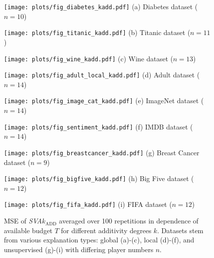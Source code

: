 \begin{figure*}[ht]
\centering
\begin{minipage}[c]{0.32\textwidth}
   \centering
   \texttt{[image: plots/fig\_diabetes\_kadd.pdf]}
   (a) Diabetes dataset ($n=10$)
   \label{fig:diabetes_kadd}
\end{minipage}
\begin{minipage}[c]{0.32\textwidth}
    \centering
    \texttt{[image: plots/fig\_titanic\_kadd.pdf]}
    (b) Titanic dataset ($n=11$)
    \label{fig:titanic_kadd}
\end{minipage}
\begin{minipage}[c]{0.32\textwidth}
    \centering
    \texttt{[image: plots/fig\_wine\_kadd.pdf]}
    (c) Wine dataset ($n=13$)
    \label{fig:wine_kadd}
\end{minipage}
%
\begin{minipage}[c]{0.32\textwidth}
    \centering
    \texttt{[image: plots/fig\_adult\_local\_kadd.pdf]}
    (d) Adult dataset ($n=14$)
    \label{fig:adult_local_kadd}
\end{minipage}
\begin{minipage}[c]{0.32\textwidth}
   \centering
   \texttt{[image: plots/fig\_image\_cat\_kadd.pdf]}
   (e) ImageNet dataset ($n=14$)
   \label{fig:image_cat_kadd}
\end{minipage}
\begin{minipage}[c]{0.32\textwidth}
    \centering
    \texttt{[image: plots/fig\_sentiment\_kadd.pdf]}
    (f) IMDB dataset ($n=14$)
    \label{fig:sentiment_kadd}
\end{minipage}
%
\begin{minipage}[c]{0.32\textwidth}
   \centering
   \texttt{[image: plots/fig\_breastcancer\_kadd.pdf]}
   (g) Breast Cancer dataset ($n=9$)
   \label{fig:breastcancer_kadd}
\end{minipage}
\begin{minipage}[c]{0.32\textwidth}
    \centering
    \texttt{[image: plots/fig\_bigfive\_kadd.pdf]}
    (h) Big Five dataset ($n=12$)
    \label{fig:bigfive_kadd}
\end{minipage}
\begin{minipage}[c]{0.32\textwidth}
    \centering
    \texttt{[image: plots/fig\_fifa\_kadd.pdf]}
    (i) FIFA dataset ($n=12$)
    \label{fig:fifa_kadd}
\end{minipage}
\caption{
MSE of \emph{SVA}$k_{\text{ADD}}$ averaged over 100 repetitions in dependence of available budget $T$ for different additivity degrees $k$.
Datasets stem from various explanation types: global (a)-(c), local (d)-(f), and unsupervised (g)-(i) with differing player numbers $n$.
}
\label{fig:proposal_results}
\end{figure*}

